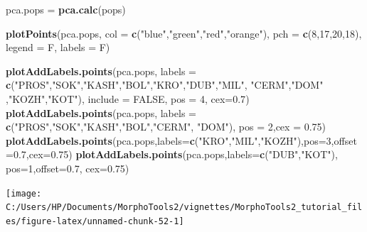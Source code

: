 \documentclass[
]{article}
\newenvironment{Shaded}{\begin{snugshade}}{\end{snugshade}}
\newcommand{\DataTypeTok}[1]{\textcolor[rgb]{0.13,0.29,0.53}{#1}}
\newcommand{\DecValTok}[1]{\textcolor[rgb]{0.00,0.00,0.81}{#1}}
\newcommand{\FloatTok}[1]{\textcolor[rgb]{0.00,0.00,0.81}{#1}}
\newcommand{\KeywordTok}[1]{\textcolor[rgb]{0.13,0.29,0.53}{\textbf{#1}}}
\newcommand{\NormalTok}[1]{#1}
\newcommand{\OtherTok}[1]{\textcolor[rgb]{0.56,0.35,0.01}{#1}}
\newcommand{\StringTok}[1]{\textcolor[rgb]{0.31,0.60,0.02}{#1}}
\begin{document}
\begin{Shaded}
\begin{Highlighting}[]
\NormalTok{pca.pops =}\StringTok{ }\KeywordTok{pca.calc}\NormalTok{(pops)}

\KeywordTok{plotPoints}\NormalTok{(pca.pops, }\DataTypeTok{col =} \KeywordTok{c}\NormalTok{(}\StringTok{"blue"}\NormalTok{,}\StringTok{"green"}\NormalTok{,}\StringTok{"red"}\NormalTok{,}\StringTok{"orange"}\NormalTok{), }\DataTypeTok{pch =} \KeywordTok{c}\NormalTok{(}\DecValTok{8}\NormalTok{,}\DecValTok{17}\NormalTok{,}\DecValTok{20}\NormalTok{,}\DecValTok{18}\NormalTok{), }
            \DataTypeTok{legend =}\NormalTok{ F, }\DataTypeTok{labels =}\NormalTok{ F)}

\KeywordTok{plotAddLabels.points}\NormalTok{(pca.pops, }\DataTypeTok{labels =} \KeywordTok{c}\NormalTok{(}\StringTok{"PROS"}\NormalTok{,}\StringTok{"SOK"}\NormalTok{,}\StringTok{"KASH"}\NormalTok{,}\StringTok{"BOL"}\NormalTok{,}\StringTok{"KRO"}\NormalTok{,}\StringTok{"DUB"}\NormalTok{,}\StringTok{"MIL"}\NormalTok{,}
                      \StringTok{"CERM"}\NormalTok{,}\StringTok{"DOM"}\NormalTok{ ,}\StringTok{"KOZH"}\NormalTok{,}\StringTok{"KOT"}\NormalTok{), }\DataTypeTok{include =} \OtherTok{FALSE}\NormalTok{, }\DataTypeTok{pos =} \DecValTok{4}\NormalTok{, }\DataTypeTok{cex=}\FloatTok{0.7}\NormalTok{)}
\KeywordTok{plotAddLabels.points}\NormalTok{(pca.pops, }\DataTypeTok{labels =} \KeywordTok{c}\NormalTok{(}\StringTok{"PROS"}\NormalTok{,}\StringTok{"SOK"}\NormalTok{,}\StringTok{"KASH"}\NormalTok{,}\StringTok{"BOL"}\NormalTok{,}\StringTok{"CERM"}\NormalTok{, }\StringTok{"DOM"}\NormalTok{), }
                      \DataTypeTok{pos =} \DecValTok{2}\NormalTok{,}\DataTypeTok{cex =} \FloatTok{0.75}\NormalTok{)}
\KeywordTok{plotAddLabels.points}\NormalTok{(pca.pops,}\DataTypeTok{labels=}\KeywordTok{c}\NormalTok{(}\StringTok{"KRO"}\NormalTok{,}\StringTok{"MIL"}\NormalTok{,}\StringTok{"KOZH"}\NormalTok{),}\DataTypeTok{pos=}\DecValTok{3}\NormalTok{,}\DataTypeTok{offset=}\FloatTok{0.7}\NormalTok{,}\DataTypeTok{cex=}\FloatTok{0.75}\NormalTok{)}
\KeywordTok{plotAddLabels.points}\NormalTok{(pca.pops,}\DataTypeTok{labels=}\KeywordTok{c}\NormalTok{(}\StringTok{"DUB"}\NormalTok{,}\StringTok{"KOT"}\NormalTok{), }\DataTypeTok{pos=}\DecValTok{1}\NormalTok{,}\DataTypeTok{offset=}\FloatTok{0.7}\NormalTok{, }\DataTypeTok{cex=}\FloatTok{0.75}\NormalTok{)}
\end{Highlighting}
\end{Shaded}

\begin{center}\texttt{[image: C:/Users/HP/Documents/MorphoTools2/vignettes/MorphoTools2\_tutorial\_files/figure-latex/unnamed-chunk-52-1]} \end{center}
\end{document}
